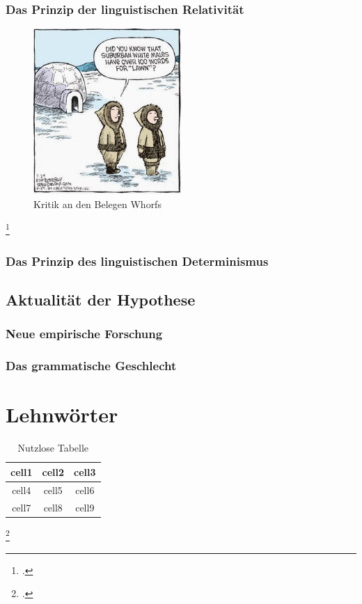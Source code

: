 \documentclass[12pt]{scrreprt}
\begin{document}
		\subsection{Das Prinzip der linguistischen Relativität}
		\label{sec:s_p_lingrelativ}
		\begin{figure}[!htb]
			\centering
			\includegraphics[width=0.5\textwidth]{inuitcartoon}
			\caption[Kritik an den Belegen Whorfs {\autocite{cartoon:Inuit}}]{Kritik an den Belegen Whorfs\footnotemark}
			\label{fig:nutzlos}
		\end{figure}
		\footcitetext{cartoon:Inuit}

		\subsection{Das Prinzip des linguistischen Determinismus}
		\label{sec:s_p_lingdetermin}
	\section{Aktualität der Hypothese}
	\label{sec:s_p_aktualität}
		\subsection{Neue empirische Forschung}
		\label{sec:s_p_emp_forschung}
		\subsection{Das grammatische Geschlecht}
		\label{sec:s_p_gram_geschlecht}

\chapter{Lehnwörter}
\label{chap:lehnwörter}

\begin{table}[!htb]
	\centering
	\caption[Nutzlose Tabelle {\autocite{a}}]{Nutzlose Tabelle\footnotemark}
	\begin{tabular}{ |c|c|c| }
		\hline
		cell1 & cell2 & cell3 \\
		\hline
		cell4 & cell5 & cell6 \\
		cell7 & cell8 & cell9 \\
		\hline
	\end{tabular}
	\label{tab:nutzlos}
\end{table}
\footcitetext{a}
\end{document}
